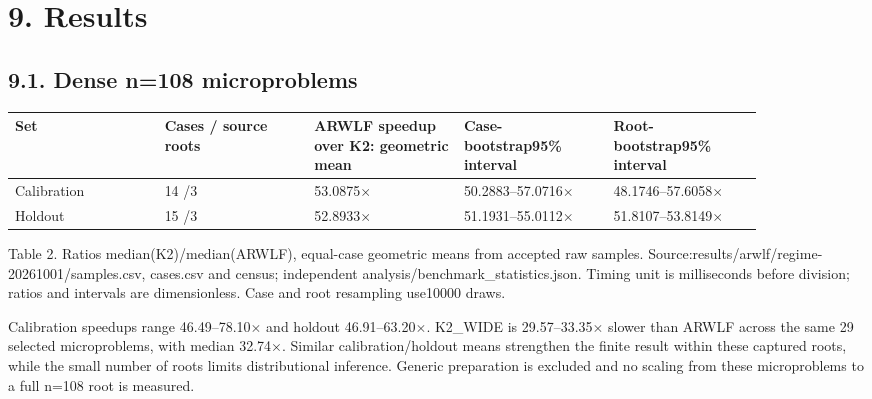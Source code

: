 \documentclass[10pt,letterpaper]{article}
\begin{document}
\section*{9. Results}

\subsection*{9.1. Dense n=108 microproblems}

{\small\setlength{\tabcolsep}{3pt}\begin{longtable}{p{0.174\linewidth} p{0.174\linewidth} p{0.174\linewidth} p{0.174\linewidth} p{0.174\linewidth}}
\toprule

\textbf{Set} & \textbf{Cases / source roots} & \textbf{ARWLF speedup over K2: geometric mean} & \textbf{Case-bootstrap95\% interval} & \textbf{Root-bootstrap95\% interval} \\
\midrule\endhead

Calibration & 14 /3 & 53.0875\ensuremath{\times} & 50.2883--57.0716\ensuremath{\times} & 48.1746--57.6058\ensuremath{\times} \\

Holdout & 15 /3 & 52.8933\ensuremath{\times} & 51.1931--55.0112\ensuremath{\times} & 51.8107--53.8149\ensuremath{\times} \\

\bottomrule\end{longtable}}

{\small\color{teal}Table 2. Ratios median(K2)/median(ARWLF), equal-case geometric means from accepted raw samples. Source:results/arwlf/regime-20261001/samples.csv, cases.csv and census; independent analysis/benchmark\_statistics.json. Timing unit is milliseconds before division; ratios and intervals are dimensionless. Case and root resampling use10000 draws.\par}

Calibration speedups range 46.49--78.10\ensuremath{\times} and holdout 46.91--63.20\ensuremath{\times}. K2\_WIDE is 29.57--33.35\ensuremath{\times} slower than ARWLF across the same 29 selected microproblems, with median 32.74\ensuremath{\times}. Similar calibration/holdout means strengthen the finite result within these captured roots, while the small number of roots limits distributional inference. Generic preparation is excluded and no scaling from these microproblems to a full n=108 root is measured.
\end{document}
